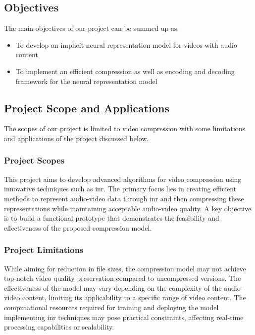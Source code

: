 \documentclass{ioereport}
\begin{document}
    \subsection{Objectives}
    The main objectives of our project can be summed up as:
    \begin{itemize}
        \item To develop an implicit neural representation model for videos with audio content
        
        \item To implement an efficient compression as well as encoding and decoding framework for the neural representation model

    \end{itemize}

    
    \subsection{Project Scope and Applications}
    The scopes of our project is limited to video compression with some limitations and applications of the project discussed below.
        \subsubsection{Project Scopes}
        This project aims to develop advanced algorithms for video compression using innovative techniques such as \gls{inr}. The primary focus lies in creating efficient methods to represent audio-video data through \gls{inr} and then compressing these representations while maintaining acceptable audio-video quality. A key objective is to build a functional prototype that demonstrates the feasibility and effectiveness of the proposed compression model.
        
        \subsubsection{Project Limitations}
        While aiming for reduction in file sizes, the compression model may not achieve top-notch video quality preservation compared to uncompressed versions. The effectiveness of the model may vary depending on the complexity of the audio-video content, limiting its applicability to a specific range of video content. The computational resources required for training and deploying the model implementing \gls{inr} techniques may pose practical constraints, affecting real-time processing capabilities or scalability.
\end{document}
